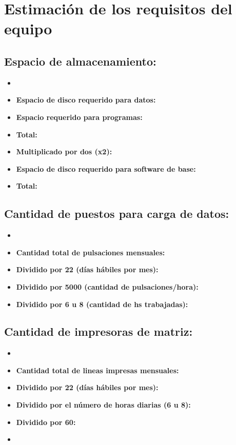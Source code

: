 \section{Estimación de los requisitos del equipo}

\subsection{Espacio de almacenamiento:}
\begin{itemize}
  \item {}
  \item \textbf{Espacio de disco requerido para datos:}
  \item \textbf{Espacio requerido para programas:}
  \item \textbf{Total:}
  \item \textbf{Multiplicado por dos (x2):}
  \item \textbf{Espacio de disco requerido para software de base:}
  \item \textbf{Total:}
\end{itemize}

\subsection{Cantidad de puestos para carga de datos:}
\begin{itemize}
  \item {}
  \item \textbf{Cantidad total de pulsaciones mensuales:}
  \item \textbf{Dividido por 22 (días hábiles por mes):}
  \item \textbf{Dividido por 5000 (cantidad de pulsaciones/hora):}
  \item \textbf{Dividido por 6 u 8 (cantidad de hs trabajadas):}
\end{itemize}

\subsection{Cantidad de impresoras de matriz:}
\begin{itemize}
  \item {}
  \item \textbf{Cantidad total de lineas impresas mensuales:}
  \item \textbf{Dividido por 22 (días hábiles por mes):}
  \item \textbf{Dividido por el número de horas diarias (6 u 8):}
  \item \textbf{Dividido por 60:}
  \item {}
\end{itemize}
